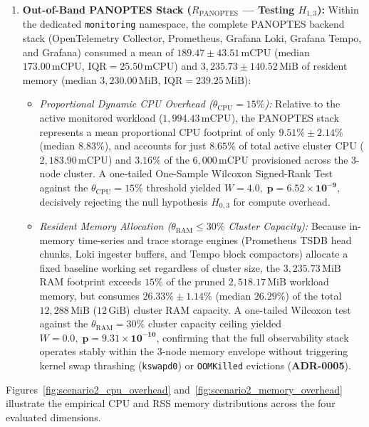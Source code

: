 \begin{enumerate}
    \item \textbf{Out-of-Band PANOPTES Stack ($R_{\text{PANOPTES}}$ --- Testing $H_{1,3}$):} Within the dedicated \texttt{monitoring} namespace, the complete PANOPTES backend stack (OpenTelemetry Collector, Prometheus, Grafana Loki, Grafana Tempo, and Grafana) consumed a mean of $189.47 \pm 43.51\,\text{mCPU}$ (median $173.00\,\text{mCPU}$, $\text{IQR} = 25.50\,\text{mCPU}$) and $3{,}235.73 \pm 140.52\,\text{MiB}$ of resident memory (median $3{,}230.00\,\text{MiB}$, $\text{IQR} = 239.25\,\text{MiB}$):
    \begin{itemize}
        \item \textit{Proportional Dynamic CPU Overhead ($\theta_{\text{CPU}} = 15\%$):} Relative to the active monitored workload ($1{,}994.43\,\text{mCPU}$), the PANOPTES stack represents a mean proportional CPU footprint of only $\mathbf{9.51\% \pm 2.14\%}$ (median $\mathbf{8.83\%}$), and accounts for just $8.65\%$ of total active cluster CPU ($2{,}183.90\,\text{mCPU}$) and $3.16\%$ of the $6{,}000\,\text{mCPU}$ provisioned across the 3-node cluster. A one-tailed One-Sample Wilcoxon Signed-Rank Test against the $\theta_{\text{CPU}} = 15\%$ threshold yielded $W = 4.0, \; \mathbf{p = 6.52 \times 10^{-9}}$, decisively rejecting the null hypothesis $H_{0,3}$ for compute overhead.
        \item \textit{Resident Memory Allocation ($\theta_{\text{RAM}} \le 30\%$ Cluster Capacity):} Because in-memory time-series and trace storage engines (Prometheus TSDB head chunks, Loki ingester buffers, and Tempo block compactors) allocate a fixed baseline working set regardless of cluster size, the $3{,}235.73\,\text{MiB}$ RAM footprint exceeds $15\%$ of the pruned $2{,}518.17\,\text{MiB}$ workload memory, but consumes $\mathbf{26.33\% \pm 1.14\%}$ (median $\mathbf{26.29\%}$) of the total $12{,}288\,\text{MiB}$ ($12\,\text{GiB}$) cluster RAM capacity. A one-tailed Wilcoxon test against the $\theta_{\text{RAM}} = 30\%$ cluster capacity ceiling yielded $W = 0.0, \; \mathbf{p = 9.31 \times 10^{-10}}$, confirming that the full observability stack operates stably within the 3-node memory envelope without triggering kernel swap thrashing (\texttt{kswapd0}) or \texttt{OOMKilled} evictions (\textbf{ADR-0005}).
    \end{itemize}
\end{enumerate}

Figures~\ref{fig:scenario2_cpu_overhead} and~\ref{fig:scenario2_memory_overhead} illustrate the empirical CPU and RSS memory distributions across the four evaluated dimensions.

